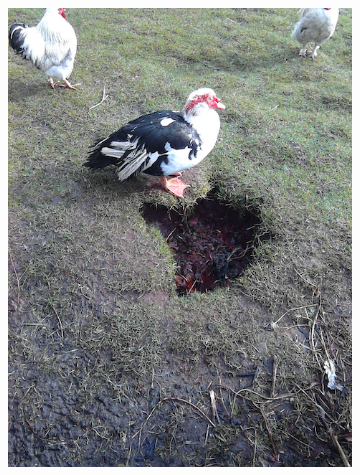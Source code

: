 \documentclass{l4proj}
\begin{document}
\begin{figure}[ht]
\begin{subfigure}[h!]{0.18\textwidth}
    \includegraphics[width=\textwidth, trim={0cm 2.5cm 0cm 2.5cm}, clip]{images/dataset/ugly_duck/rgb.png}

\end{subfigure}
\end{figure}
\end{document}
